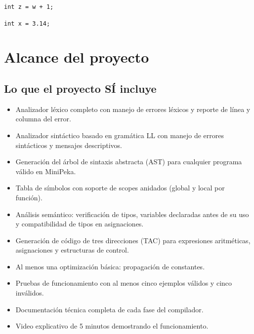 \documentclass[12pt]{article}
\begin{document}
\begin{lstlisting}[caption={Error semántico: variable no declarada}]
int z = w + 1;
\end{lstlisting}

\begin{lstlisting}[caption={Error semántico: tipos incompatibles}]
int x = 3.14;
\end{lstlisting}

\section{Alcance del proyecto}

\subsection{Lo que el proyecto SÍ incluye}

\begin{itemize}
    \item Analizador léxico completo con manejo de errores léxicos y
          reporte de línea y columna del error.

    \item Analizador sintáctico basado en gramática LL con manejo de
          errores sintácticos y mensajes descriptivos.

    \item Generación del árbol de sintaxis abstracta (AST) para cualquier
          programa válido en MiniPeka.

    \item Tabla de símbolos con soporte de scopes anidados (global y local
          por función).

    \item Análisis semántico: verificación de tipos, variables declaradas
          antes de su uso y compatibilidad de tipos en asignaciones.

    \item Generación de código de tres direcciones (TAC) para expresiones
          aritméticas, asignaciones y estructuras de control.

    \item Al menos una optimización básica: propagación de constantes.

    \item Pruebas de funcionamiento con al menos cinco ejemplos válidos
          y cinco inválidos.

    \item Documentación técnica completa de cada fase del compilador.

    \item Video explicativo de 5 minutos demostrando el funcionamiento.
\end{itemize}
\end{document}
